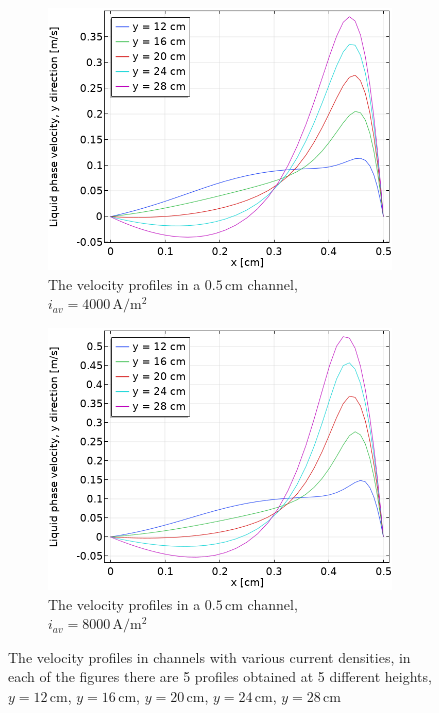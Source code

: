 \begin{figure}
\begin{subfigure}{.5\textwidth}
  \centering
  \includegraphics[width=1\linewidth]{velocityprofilenosaff5mm4000A.png}
  \caption{The velocity profiles in a $0.5 \, \mathrm{cm}$ channel, $i_{av}=4000 \, \mathrm{A/m^2}$}
\end{subfigure}%
\begin{subfigure}{.5\textwidth}
  \centering
  \includegraphics[width=1\linewidth]{velocityprofilenosaff5mm8000A.png}
  \caption{The velocity profiles in a $0.5 \, \mathrm{cm}$ channel, $i_{av}=8000 \, \mathrm{A/m^2}$}
\end{subfigure}
\caption{The velocity profiles in channels with various current densities, in each of the figures there are 5 profiles obtained at 5 different heights, $y = 12 \, \mathrm{cm}$, $y = 16 \, \mathrm{cm}$, $y = 20 \, \mathrm{cm}$, $y = 24 \, \mathrm{cm}$, $y = 28 \, \mathrm{cm}$}
\label{velocitycurrentdensitywithcomparison}
\end{figure}

